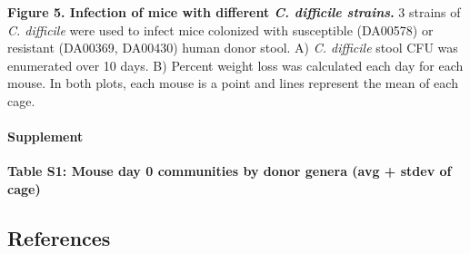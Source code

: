 \documentclass[11pt,]{article}
\begin{document}
\textbf{Figure 5. Infection of mice with different \emph{C. difficile
strains}.} 3 strains of \emph{C. difficile} were used to infect mice
colonized with susceptible (DA00578) or resistant (DA00369, DA00430)
human donor stool. A) \emph{C. difficile} stool CFU was enumerated over
10 days. B) Percent weight loss was calculated each day for each mouse.
In both plots, each mouse is a point and lines represent the mean of
each cage.

\paragraph{Supplement}\label{supplement}

\textbf{Table S1: Mouse day 0 communities by donor genera (avg + stdev
of cage)}

\newpage

\subsection{References}\label{references}
\end{document}
